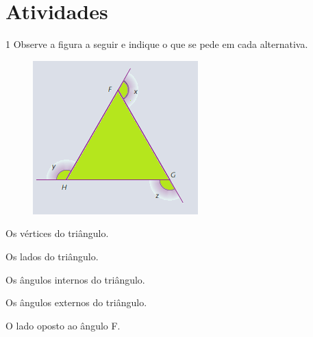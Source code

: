 {{{\section*{Atividades}

\num{1} Observe a figura a seguir e indique o que se pede em cada alternativa.

\begin{figure}[H]
\centering\includegraphics[width=\textwidth]{./imgSAEB_8_MAT/media/image13.png}
\end{figure}

\begin{escolha}[itemsep=0pt]
\item Os vértices do triângulo.
        
\item Os lados do triângulo.
        
\item Os ângulos internos do triângulo.
        
\item Os ângulos externos do triângulo.
        
\item O lado oposto ao ângulo F.
        
\end{escolha}


}}}
